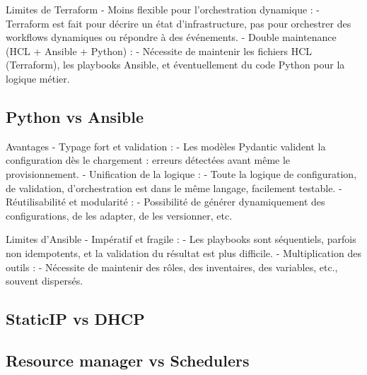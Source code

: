 Limites de Terraform
- Moins flexible pour l'orchestration dynamique :
- Terraform est fait pour décrire un état d'infrastructure, pas pour orchestrer des workflows dynamiques ou répondre à des événements.
- Double maintenance (HCL + Ansible + Python) :
- Nécessite de maintenir les fichiers HCL (Terraform), les playbooks Ansible, et éventuellement du code Python pour la logique métier.

\subsection{Python vs Ansible}

Avantages
- Typage fort et validation :
- Les modèles Pydantic valident la configuration dès le chargement : erreurs détectées avant même le provisionnement.
- Unification de la logique :
- Toute la logique de configuration, de validation, d'orchestration est dans le même langage, facilement testable.
- Réutilisabilité et modularité :
- Possibilité de générer dynamiquement des configurations, de les adapter, de les versionner, etc.

Limites d'Ansible
- Impératif et fragile :
- Les playbooks sont séquentiels, parfois non idempotents, et la validation du résultat est plus difficile.
- Multiplication des outils :
- Nécessite de maintenir des rôles, des inventaires, des variables, etc., souvent dispersés.

\subsection{StaticIP vs DHCP}

\subsection{Resource manager vs Schedulers}